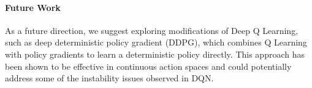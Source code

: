 \documentclass{article}
\begin{document}
\paragraph{Future Work} As a future direction, we suggest exploring modifications of Deep Q Learning,
such as deep deterministic policy gradient (DDPG), which combines Q Learning
with policy gradients to learn a deterministic policy directly. This approach
has been shown to be effective in continuous action spaces and could
potentially address some of the instability issues observed in DQN.

\newpage
\nocite{*}


\end{document}

